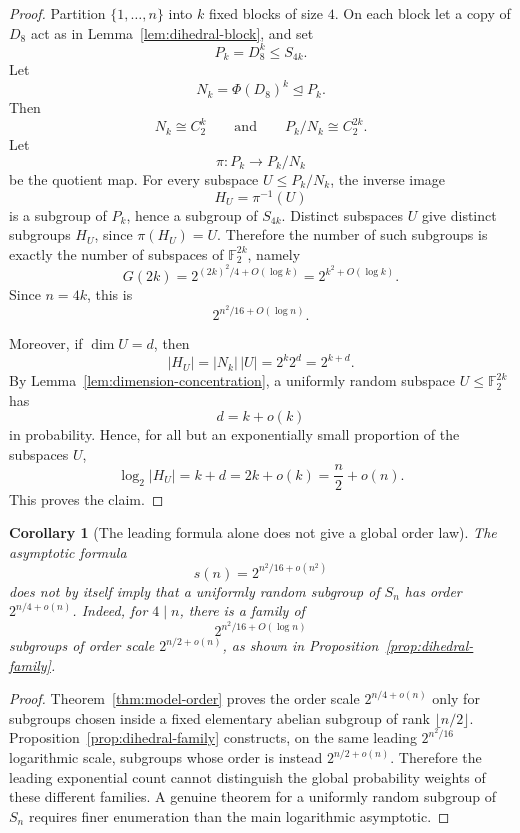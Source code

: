 \documentclass[a4paper,11pt]{amsart}
\newtheorem{corollary}[theorem]{Corollary}
\theoremstyle{remark}
\newcommand{\F}{\mathbb F}
\begin{document}
\begin{proof}
Partition \(\{1,\ldots,n\}\) into \(k\) fixed blocks of size \(4\). On each block let a copy of
\(D_8\) act as in Lemma~\ref{lem:dihedral-block}, and set
\[
        P_k=D_8^k\leq S_{4k}.
\]
Let
\[
        N_k=\Phi(D_8)^k\trianglelefteq P_k.
\]
Then
\[
        N_k\cong C_2^k
        \qquad\text{and}\qquad
        P_k/N_k\cong C_2^{2k}.
\]
Let
\[
        \pi:P_k\to P_k/N_k
\]
be the quotient map. For every subspace \(U\leq P_k/N_k\), the inverse image
\[
        H_U=\pi^{-1}(U)
\]
is a subgroup of \(P_k\), hence a subgroup of \(S_{4k}\). Distinct subspaces \(U\) give distinct
subgroups \(H_U\), since \(\pi(H_U)=U\). Therefore the number of such subgroups is exactly the
number of subspaces of \(\F_2^{2k}\), namely
\[
        G(2k)=2^{(2k)^2/4+O(\log k)}=2^{k^2+O(\log k)}.
\]
Since \(n=4k\), this is
\[
        2^{n^2/16+O(\log n)}.
\]

Moreover, if \(\dim U=d\), then
\[
        |H_U|=|N_k|\,|U|=2^k 2^d=2^{k+d}.
\]
By Lemma~\ref{lem:dimension-concentration}, a uniformly random subspace \(U\leq\F_2^{2k}\) has
\[
        d=k+o(k)
\]
in probability. Hence, for all but an exponentially small proportion of the subspaces \(U\),
\[
        \log_2 |H_U|=k+d=2k+o(k)=\frac n2+o(n).
\]
This proves the claim.
\end{proof}

\begin{corollary}[The leading formula alone does not give a global order law]\label{cor:order-caution}
The asymptotic formula
\[
        s(n)=2^{n^2/16+o(n^2)}
\]
does not by itself imply that a uniformly random subgroup of \(S_n\) has order
\(2^{n/4+o(n)}\). Indeed, for \(4\mid n\), there is a family of
\[
        2^{n^2/16+O(\log n)}
\]
subgroups of order scale \(2^{n/2+o(n)}\), as shown in
Proposition~\ref{prop:dihedral-family}.
\end{corollary}

\begin{proof}
Theorem~\ref{thm:model-order} proves the order scale \(2^{n/4+o(n)}\) only for subgroups chosen
inside a fixed elementary abelian subgroup of rank \(\lfloor n/2\rfloor\). Proposition~\ref{prop:dihedral-family}
constructs, on the same leading \(2^{n^2/16}\) logarithmic scale, subgroups whose order is instead
\(2^{n/2+o(n)}\). Therefore the leading exponential count cannot distinguish the global
probability weights of these different families. A genuine theorem for a uniformly random subgroup
of \(S_n\) requires finer enumeration than the main logarithmic asymptotic.
\end{proof}
\end{document}
